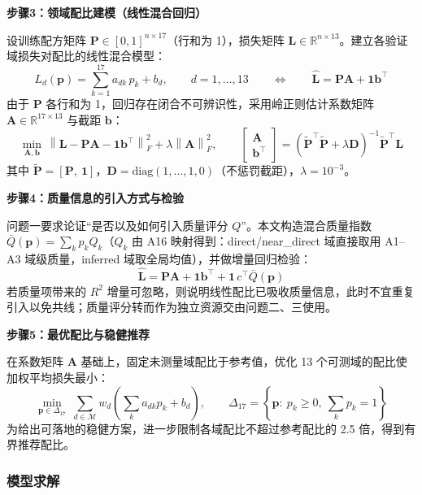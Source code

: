 \textbf{步骤3：领域配比建模（线性混合回归）}

设训练配方矩阵 $\bm P\in[0,1]^{n\times 17}$（行和为 1），损失矩阵 $\bm L\in\mathbb R^{n\times 13}$。建立各验证域损失对配比的线性混合模型：
\begin{equation}
    L_{d}(\bm p) = \sum_{k=1}^{17} a_{dk}\, p_k + b_d,\qquad d=1,\dots,13
    \qquad\Longleftrightarrow\qquad
    \hat{\bm L} = \bm P \bm A + \bm 1 \bm b^{\top}
\end{equation}
由于 $\bm P$ 各行和为 1，回归存在闭合不可辨识性，采用岭正则估计系数矩阵 $\bm A\in\mathbb R^{17\times 13}$ 与截距 $\bm b$：
\begin{equation}
    \min_{\bm A,\bm b}\ \left\|\bm L-\bm P\bm A-\bm 1\bm b^{\top}\right\|_F^2 + \lambda\left\|\bm A\right\|_F^2,
    \qquad
    \begin{bmatrix}\bm A\\ \bm b^{\top}\end{bmatrix}
    = \left(\tilde{\bm P}^{\top}\tilde{\bm P}+\lambda \bm D\right)^{-1}\tilde{\bm P}^{\top}\bm L
\end{equation}
其中 $\tilde{\bm P}=[\bm P,\ \bm 1]$，$\bm D=\mathrm{diag}(1,\dots,1,0)$（不惩罚截距），$\lambda=10^{-3}$。

\textbf{步骤4：质量信息的引入方式与检验}

问题一要求论证“是否以及如何引入质量评分 $Q$”。本文构造混合质量指数 $\bar Q(\bm p)=\sum_k p_k Q_k$（$Q_k$ 由 A16 映射得到：direct/near\_direct 域直接取用 A1--A3 域级质量，inferred 域取全局均值），并做增量回归检验：
\begin{equation}
    \hat{\bm L} = \bm P \bm A + \bm 1 \bm b^{\top} + \bm 1\, c^{\top}\bar Q(\bm p)
\end{equation}
若质量项带来的 $R^2$ 增量可忽略，则说明线性配比已吸收质量信息，此时不宜重复引入以免共线；质量评分转而作为独立资源交由问题二、三使用。

\textbf{步骤5：最优配比与稳健推荐}

在系数矩阵 $\bm A$ 基础上，固定未测量域配比于参考值，优化 13 个可测域的配比使加权平均损失最小：
\begin{equation}
    \min_{\bm p\in\Delta_{17}}\ \sum_{d\in\mathcal M} w_d\left(\sum_k a_{dk}p_k+b_d\right),
    \qquad \Delta_{17}=\left\{\bm p:\ p_k\ge0,\ \textstyle\sum_k p_k=1\right\}
\end{equation}
为给出可落地的稳健方案，进一步限制各域配比不超过参考配比的 2.5 倍，得到有界推荐配比。

\subsubsection{模型求解}


